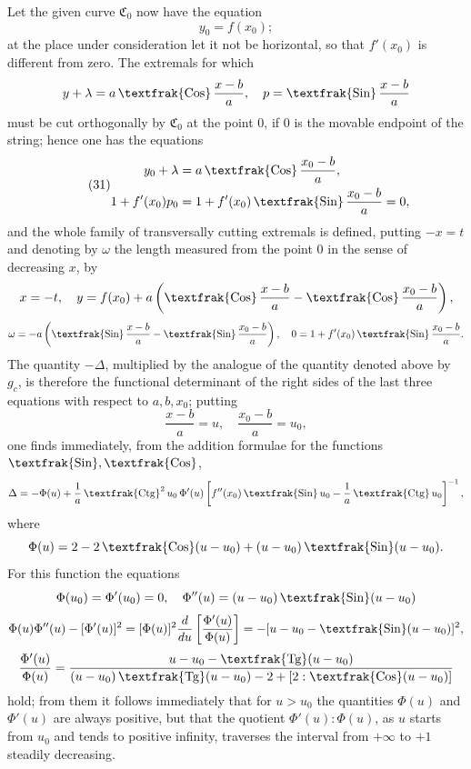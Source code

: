 \documentclass[11pt,a4paper,leqno]{article}
\newcommand{\Cof}{\mathop{\text{\textfrak{Cos}}}\nolimits}
\newcommand{\Sin}{\mathop{\text{\textfrak{Sin}}}\nolimits}
\newcommand{\Tg}{\mathop{\text{\textfrak{Tg}}}\nolimits}
\newcommand{\Ctg}{\mathop{\text{\textfrak{Ctg}}}\nolimits}
\begin{document}
Let the given curve $\mathfrak{C}_0$ now have the equation
\[
y_0=f(x_0);
\]
at the place under consideration let it not be horizontal, so that $f'(x_0)$ is different from zero. The extremals for which
\[
y+\lambda=a\Cof\frac{x-b}{a},\quad p=\Sin\frac{x-b}{a}
\]
must be cut orthogonally by $\mathfrak{C}_0$ at the point 0, if 0 is the movable endpoint of the string; hence one has the equations
\begin{equation}\tag{31}
\begin{aligned}
y_0+\lambda&=a\Cof\frac{x_0-b}{a},\\
1+f'(x_0)p_0&=1+f'(x_0)\Sin\frac{x_0-b}{a}=0,
\end{aligned}
\end{equation}
and the whole family of transversally cutting extremals is defined, putting $-x=t$ and denoting by $\omega$ the length measured from the point 0 in the sense of decreasing $x$, by
\[
x=-t,\quad y=f(x_0)+a\left(\Cof\frac{x-b}{a}-\Cof\frac{x_0-b}{a}\right),
\]
\[
\omega=-a\left(\Sin\frac{x-b}{a}-\Sin\frac{x_0-b}{a}\right),\quad
0=1+f'(x_0)\Sin\frac{x_0-b}{a}.
\]
The quantity $-\Delta$, multiplied by the analogue of the quantity denoted above by $g_c$, is therefore the functional determinant of the right sides of the last three equations with respect to $a,b,x_0$; putting
\[
\frac{x-b}{a}=u,
\quad
\frac{x_0-b}{a}=u_0,
\]
one finds immediately, from the addition formulae for the functions $\Sin,\Cof$,
\[
\Delta=-\Phi(u)+\frac{1}{a}\Ctg^2u_0\,\Phi'(u)\left[f''(x_0)\Sin u_0-\frac{1}{a}\Ctg u_0\right]^{-1},
\]
where
\[
\Phi(u)=2-2\Cof(u-u_0)+(u-u_0)\Sin(u-u_0).
\]
For this function the equations
\[
\Phi(u_0)=\Phi'(u_0)=0,\quad \Phi''(u)=(u-u_0)\Sin(u-u_0)
\]
\[
\Phi(u)\Phi''(u)-[\Phi'(u)]^2=[\Phi(u)]^2\frac{d}{du}\left[\frac{\Phi'(u)}{\Phi(u)}\right]
= -[u-u_0-\Sin(u-u_0)]^2,
\]
\[
\frac{\Phi'(u)}{\Phi(u)}=\frac{u-u_0-\Tg(u-u_0)}{(u-u_0)\Tg(u-u_0)-2+[2:\Cof(u-u_0)]}
\]
hold; from them it follows immediately that for $u>u_0$ the quantities $\Phi(u)$ and $\Phi'(u)$ are always positive, but that the quotient $\Phi'(u):\Phi(u)$, as $u$ starts from $u_0$ and tends to positive infinity, traverses the interval from $+\infty$ to $+1$ steadily decreasing.
\end{document}
